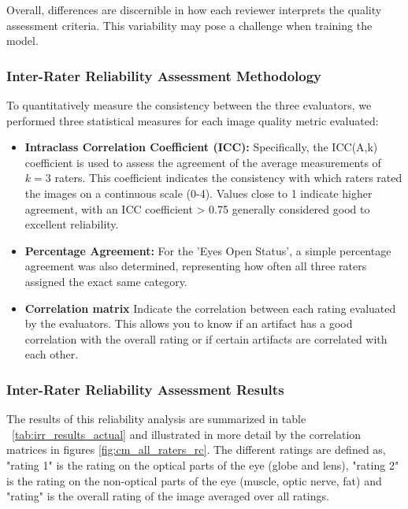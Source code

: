 Overall, differences are discernible in how each reviewer interprets the quality assessment criteria. This variability may pose a challenge when training the model.

\subsubsection{Inter-Rater Reliability Assessment Methodology}
\label{sssec:irr_methodology}
To quantitatively measure the consistency between the three evaluators, we performed three statistical measures for each image quality metric evaluated:
\begin{itemize}
    \item \textbf{Intraclass Correlation Coefficient (ICC):} Specifically, the ICC(A,k) coefficient is used to assess the agreement of the average measurements of $k=3$ raters. This coefficient indicates the consistency with which raters rated the images on a continuous scale (0-4). Values close to 1 indicate higher agreement, with an ICC coefficient > 0.75 generally considered good to excellent reliability.
    \item \textbf{Percentage Agreement:} For the 'Eyes Open Status', a simple percentage agreement was also determined, representing how often all three raters assigned the exact same category.
    \item \textbf{Correlation matrix} Indicate the correlation between each rating evaluated by the evaluators. This allows you to know if an artifact has a good correlation with the overall rating or if certain artifacts are correlated with each other.
\end{itemize}
\subsubsection{Inter-Rater Reliability Assessment Results}
\label{sssec:irr_results}
The results of this reliability analysis are summarized in table ~\ref{tab:irr_results_actual} and illustrated in more detail by the correlation matrices in figures \ref{fig:cm_all_raters_rc}. The different ratings are defined as, "rating 1" is the rating on the optical parts of the eye (globe and lens), "rating 2" is the rating on the non-optical parts of the eye (muscle, optic nerve, fat) and "rating" is the overall rating of the image averaged over all ratings.

